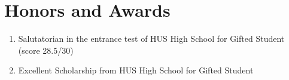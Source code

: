 \documentclass{clean_cv}
\begin{document}
\section{Honors and Awards}
\begin{enumerate}
    \item Salutatorian in the entrance test of HUS High School for Gifted Student (score 28.5/30)
    \item Excellent Scholarship from HUS High School for Gifted Student 
\end{enumerate}

    



\end{document}
